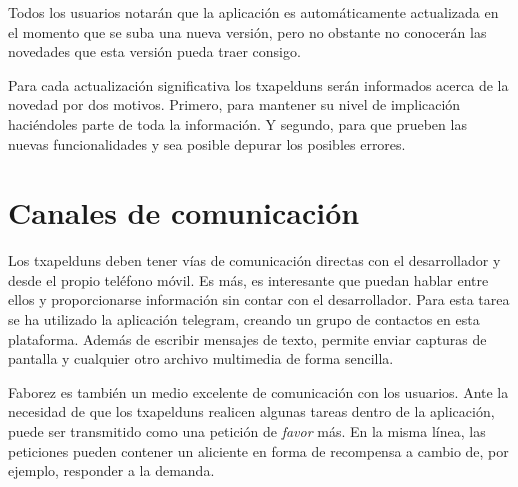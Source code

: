 \documentclass[main]{subfiles}
\begin{document}
Todos los usuarios notarán que la aplicación es automáticamente actualizada en el momento que se suba una nueva versión, pero no obstante no conocerán las novedades que esta versión pueda traer consigo.

Para cada actualización significativa los \glspl{txapeldun} serán informados acerca de la novedad por dos motivos. Primero, para mantener su nivel de implicación haciéndoles parte de toda la información. Y segundo, para que prueben las nuevas funcionalidades y sea posible depurar los posibles errores.


\section{Canales de comunicación}

Los \glspl{txapeldun} deben tener vías de comunicación directas con el desarrollador y desde el propio teléfono móvil. Es más, es interesante que puedan hablar entre ellos y proporcionarse información sin contar con el desarrollador. Para esta tarea se ha utilizado la aplicación \gls{telegram}, creando un grupo de contactos en esta plataforma. Además de escribir mensajes de texto, permite enviar capturas de pantalla y cualquier otro archivo multimedia de forma sencilla.

Faborez es también un medio excelente de comunicación con los usuarios. Ante la necesidad de que los \glspl{txapeldun} realicen algunas tareas dentro de la aplicación, puede ser transmitido como una petición de \emph{favor} más. En la misma línea, las peticiones pueden contener un aliciente en forma de recompensa a cambio de, por ejemplo, responder a la demanda. 
\end{document}
